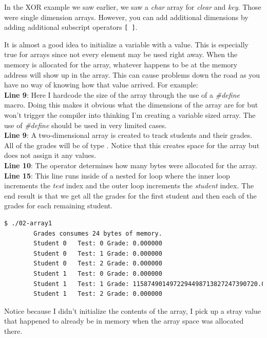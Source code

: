 \documentclass[../main.tex]{subfiles}
\begin{document}
	In the XOR example we saw earlier, we saw a \textit{char} array for \textit{clear} and \textit{key}.  Those were single dimension arrays.  However, you can add additional dimensions by adding additional subscript operators \texttt{[ ]}.
	
	It is almost a good idea to initialize a variable with a value.  This is especially true for arrays since not every element may be used right away.  When the memory is allocated for the array, whatever happens to be at the memory address will show up in the array.  This can cause problems down the road as you have no way of knowing how that value arrived.  For example:\\
	
	
	
	\textbf{Line 9}: Here I hardcode the size of the array through the use of a \textit{\#define} macro.  Doing this makes it obvious what the dimensions of the array are for but won't trigger the compiler into thinking I'm creating a variable sized array. The use of \textit{\#define} should be used in very limited cases\cite{embedded_c}.\\
	\textbf{Line 9}: A two-dimensional array is created to track students and their grades.  All of the grades will be of type . Notice that this creates space for the array but does not assign it any values.\\
	\textbf{Line 10}: The  operator determines how many bytes were allocated for the array.\\
	\textbf{Line 15}: This line runs inside of a nested for loop where the inner loop increments the \textit{test} index and the outer loop increments the \textit{student} index.  The end result is that we get all the grades for the first student and then each of the grades for each remaining student.\\
	
	\begin{lstlisting}[language=bash, numbers=none]
		$ ./02-array1 
		Grades consumes 24 bytes of memory.
		Student 0	Test: 0	Grade: 0.000000
		Student 0	Test: 1	Grade: 0.000000
		Student 0	Test: 2	Grade: 0.000000
		Student 1	Test: 0	Grade: 0.000000
		Student 1	Test: 1	Grade: 1158749014972294498713827247390720.000000
		Student 1	Test: 2	Grade: 0.000000
	\end{lstlisting}
	
	Notice because I didn't initialize the contents of the array, I pick up a stray value that happened to already be in memory when the array space was allocated there.\\
	
\end{document}
